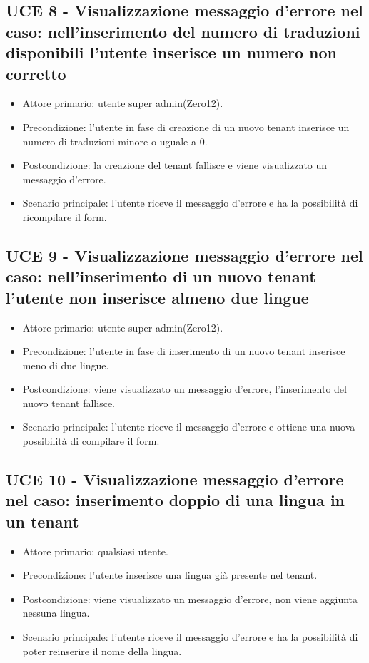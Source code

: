 \subsection{UCE 8 - Visualizzazione messaggio d'errore nel caso: nell'inserimento del numero di traduzioni disponibili l'utente inserisce un numero non corretto}
    \begin{itemize}
        \item Attore primario: utente super admin(Zero12).
        \item Precondizione: l'utente in fase di creazione di un nuovo tenant inserisce un numero di traduzioni minore o uguale a 0.
        \item Postcondizione: la creazione del tenant fallisce e viene visualizzato un messaggio d'errore.
        \item Scenario principale: l'utente riceve il messaggio d'errore e ha la possibilità di ricompilare il form.
    \end{itemize}
\subsection{UCE 9 - Visualizzazione messaggio d'errore nel caso: nell'inserimento di un nuovo tenant l'utente non inserisce almeno due lingue}
    \begin{itemize}
        \item Attore primario: utente super admin(Zero12).
        \item Precondizione: l'utente in fase di inserimento di un nuovo tenant inserisce meno di due lingue.
        \item Postcondizione: viene visualizzato un messaggio d'errore, l'inserimento del nuovo tenant fallisce.
        \item Scenario principale: l'utente riceve il messaggio d'errore e ottiene una nuova possibilità di compilare il form.
    \end{itemize}
\subsection{UCE 10 - Visualizzazione messaggio d'errore nel caso: inserimento doppio di una lingua in un tenant}
    \begin{itemize}
        \item Attore primario: qualsiasi utente.
        \item Precondizione: l'utente inserisce una lingua già presente nel tenant.
        \item Postcondizione: viene visualizzato un messaggio d'errore, non viene aggiunta nessuna lingua.
        \item Scenario principale: l'utente riceve il messaggio d'errore e ha la possibilità di poter reinserire il nome della lingua.
    \end{itemize}